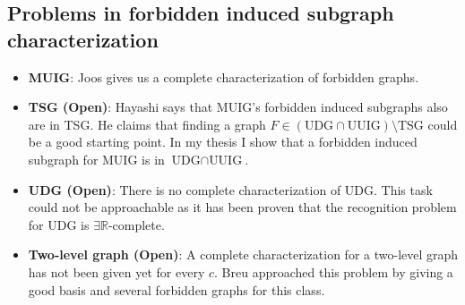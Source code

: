 \begin{appendices}

\chapter{Problems in forbidden induced subgraph characterization}
  \begin{itemize}
    \item \textbf{MUIG}: Joos \cite{joosCharacterizationMixedUnit2013} gives us a complete characterization of forbidden graphs.
    \item \textbf{TSG (Open)}: Hayashi \cite{hayashiThinStripGraphs2017} says that MUIG's forbidden induced subgraphs also are in TSG. He claims that finding a graph $F \in (\text{UDG}\cap\text{UUIG}) \setminus \text{TSG}$ could be a good starting point. In my thesis I show that a forbidden induced subgraph for MUIG is in $\text{UDG}\cap\text{UUIG}$.
    \item \textbf{UDG (Open)}: There is no complete characterization of UDG. This task could not be approachable as it has been proven that the recognition problem for UDG is $\exists\mathbb{R}$-complete.
    \item \textbf{Two-level graph (Open)}: A complete characterization for a two-level graph has not been given yet for every $c$. Breu \cite{breuAlgorithmicAspectsConstrained1996} approached this problem by giving a good basis and several forbidden graphs for this class.
  \end{itemize}


\end{appendices}
